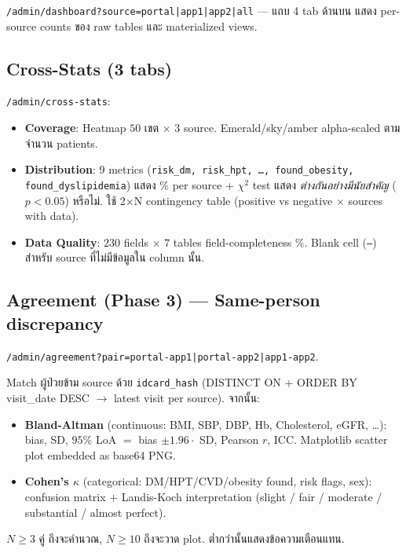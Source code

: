 \documentclass[11pt,a4paper]{article}
\begin{document}
\texttt{/admin/dashboard?source=portal|app1|app2|all} --- แถบ 4 tab ด้านบน แสดง
per-source counts ของ raw tables และ materialized views.

\subsection{Cross-Stats (3 tabs)}

\texttt{/admin/cross-stats}:

\begin{itemize}[leftmargin=*, itemsep=1pt]
  \item \textbf{Coverage}: Heatmap $50$ เขต $\times$ $3$ source.
    Emerald/sky/amber alpha-scaled ตามจำนวน patients.
  \item \textbf{Distribution}: 9 metrics (\texttt{risk\_dm, risk\_hpt, \ldots, found\_obesity, found\_dyslipidemia})
    แสดง \% per source + $\chi^2$ test แสดง \textit{ต่างกันอย่างมีนัยสำคัญ} ($p < 0.05$) หรือไม่.
    ใช้ 2$\times$N contingency table (positive vs negative $\times$ sources with data).
  \item \textbf{Data Quality}: $230$ fields $\times$ $7$ tables field-completeness $\%$.
    Blank cell (\texttt{—}) สำหรับ source ที่ไม่มีข้อมูลใน column นั้น.
\end{itemize}

\subsection{Agreement (Phase 3) --- Same-person discrepancy}

\texttt{/admin/agreement?pair=portal-app1|portal-app2|app1-app2}.

Match ผู้ป่วยข้าม source ด้วย \texttt{idcard\_hash} (DISTINCT ON + ORDER BY visit\_date DESC
$\rightarrow$ latest visit per source). จากนั้น:

\begin{itemize}[leftmargin=*, itemsep=1pt]
  \item \textbf{Bland-Altman} (continuous: BMI, SBP, DBP, Hb, Cholesterol, eGFR, \ldots):
    bias, SD, $95\%$ LoA $=$ bias $\pm 1.96 \cdot$ SD, Pearson $r$, ICC.
    Matplotlib scatter plot embedded as base64 PNG.
  \item \textbf{Cohen's $\kappa$} (categorical: DM/HPT/CVD/obesity found, risk flags, sex):
    confusion matrix $+$ Landis-Koch interpretation
    (slight / fair / moderate / substantial / almost perfect).
\end{itemize}

$N \ge 3$ คู่ ถึงจะคำนวณ, $N \ge 10$ ถึงจะวาด plot. ต่ำกว่านั้นแสดงข้อความเตือนแทน.
\end{document}
